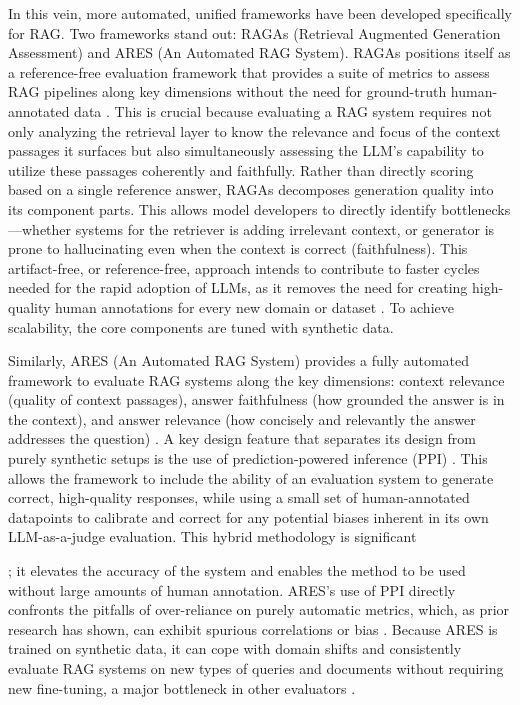 \documentclass[11pt]{article}
\begin{document}
In this vein, more automated, unified frameworks have been developed specifically for RAG. Two frameworks stand out: RAGAs (Retrieval Augmented Generation Assessment) and ARES (An Automated RAG System). RAGAs positions itself as a reference-free evaluation framework that provides a suite of metrics to assess RAG pipelines along key dimensions without the need for ground-truth human-annotated data \cite{ref26}. This is crucial because evaluating a RAG system requires not only analyzing the retrieval layer to know the relevance and focus of the context passages it surfaces but also simultaneously assessing the LLM's capability to utilize these passages coherently and faithfully. Rather than directly scoring based on a single reference answer, RAGAs decomposes generation quality into its component parts. This allows model developers to directly identify bottlenecks---whether systems for the retriever is adding irrelevant context, or generator is prone to hallucinating even when the context is correct (faithfulness). This artifact-free, or reference-free, approach intends to contribute to faster cycles needed for the rapid adoption of LLMs, as it removes the need for creating high-quality human annotations for every new domain or dataset \cite{ref412}. To achieve scalability, the core components are tuned with synthetic data.

Similarly, ARES (An Automated RAG System) provides a fully automated framework to evaluate RAG systems along the key dimensions: context relevance (quality of context passages), answer faithfulness (how grounded the answer is in the context), and answer relevance (how concisely and relevantly the answer addresses the question) \cite{ref413}. A key design feature that separates its design from purely synthetic setups is the use of prediction-powered inference (PPI) \cite{ref414}. This allows the framework to include the ability of an evaluation system to generate correct, high-quality responses, while using a small set of human-annotated datapoints to calibrate and correct for any potential biases inherent in its own LLM-as-a-judge evaluation. This hybrid methodology is significant

; it elevates the accuracy of the system and enables the method to be used without large amounts of human annotation. ARES's use of PPI directly confronts the pitfalls of over-reliance on purely automatic metrics, which, as prior research has shown, can exhibit spurious correlations or bias \cite{ref405}. Because ARES is trained on synthetic data, it can cope with domain shifts and consistently evaluate RAG systems on new types of queries and documents without requiring new fine-tuning, a major bottleneck in other evaluators \cite{ref414}.
\end{document}
